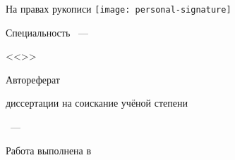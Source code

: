 \newcommand{\sfs}{\fontsize{14pt}{15pt}\selectfont}
\sfs %
\thispagestyle{empty}

\vspace{10mm}
\begin{flushright}
  \Large{На правах рукописи}
  \texttt{[image: personal-signature]} 
\end{flushright}

\vspace{20mm}
\begin{center}
{\Large\bf{\thesisAuthor}}
\end{center}

\vspace{20mm}
\begin{center}
{\bf \LARGE \thesisTitle \par}

\vspace{30mm}
{\Large Специальность \thesisSpecialtyNumber~---\par <<\thesisSpecialtyTitle>>}

\vspace{15mm}
\LARGE{Автореферат}\par
\Large{диссертации на соискание учёной степени\par \thesisDegree}
\end{center}

\vspace{40mm}
\begin{center}
{\Large{\thesisCity~--- \thesisYear}}
\end{center}

\newpage
\thispagestyle{empty}
\noindent Работа выполнена в \thesisOrganization

